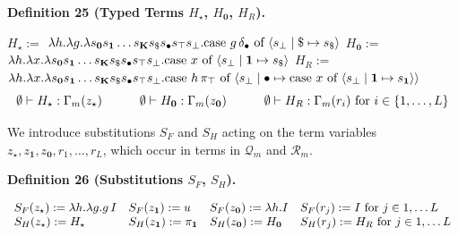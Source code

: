\par\medskip\noindent\textbf{Definition 25 (Typed Terms $H_{\star}$, $H_{\mathbf{0}}$, $H_{R}$).}\par
 
    $\displaystyle H_{\star}:=$ $\displaystyle\lambda h.\lambda g.\lambda s_{\mathbf{0}}s_{\mathbf{1}}\ldots s_%
{\mathbf{K}}s_{\$}s_{\bullet}s_{\top}s_{\bot}.\textnormal{{case }}{g\,\delta_{%
\bullet}}\textnormal{{ of }}\langle s_{\bot}\mid\$\mapsto s_{\$}\rangle$     $\displaystyle H_{\mathbf{0}}:=$ $\displaystyle\lambda h.\lambda x.\lambda s_{\mathbf{0}}s_{\mathbf{1}}\ldots s_%
{\mathbf{K}}s_{\$}s_{\bullet}s_{\top}s_{\bot}.\textnormal{{case }}{x}%
\textnormal{{ of }}\langle s_{\bot}\mid\mathbf{1}\mapsto s_{\$}\rangle$     $\displaystyle H_{R}:=$ $\displaystyle\lambda h.\lambda x.\lambda s_{\mathbf{0}}s_{\mathbf{1}}\ldots s_%
{\mathbf{K}}s_{\$}s_{\bullet}s_{\top}s_{\bot}.\textnormal{{case }}{h\,\pi_{%
\top}}\textnormal{{ of }}\langle s_{\bot}\mid\bullet\mapsto\textnormal{{case }%
}{x}\textnormal{{ of }}\langle s_{\bot}\mid\mathbf{1}\mapsto s_{\mathbf{1}}\rangle\rangle$       \[\emptyset\vdash H_{\star}:\Gamma_{m}(z_{\star})\qquad\quad\emptyset\vdash H_{%
\mathbf{0}}:\Gamma_{m}(z_{\mathbf{0}})\qquad\quad\emptyset\vdash H_{R}:\Gamma_%
{m}(r_{i})\text{ for }i\in\{1,\ldots,L\}\]    
 
 
 
We introduce substitutions $S_{F}$ and $S_{H}$ acting on the term variables $z_{\star},z_{\mathbf{1}},z_{\mathbf{0}},r_{1},\ldots,r_{L}$, which occur in terms in $\mathcal{Q}_{m}$ and $\mathcal{R}_{m}$.\par
 
 
 
\par\medskip\noindent\textbf{Definition 26 (Substitutions $S_{F}$, $S_{H}$).}\par
 
    \[\begin{array}[]{llll}S_{F}(z_{\star}):=\lambda h.\lambda g.g\,I\nobreak%
\leavevmode&S_{F}(z_{\mathbf{1}}):=u\nobreak\leavevmode&S_{F}(z_{\mathbf{0}}):%
=\lambda h.I\nobreak\leavevmode&S_{F}(r_{j}):=I\text{ for }j\in{1,\ldots L}\\
S_{H}(z_{\star}):=H_{\star}&S_{H}(z_{\mathbf{1}}):=\pi_{\mathbf{1}}&S_{H}(z_{%
\mathbf{0}}):=H_{\mathbf{0}}&S_{H}(r_{j}):=H_{R}\text{ for }j\in{1,\ldots L}%
\end{array}\]    
 
